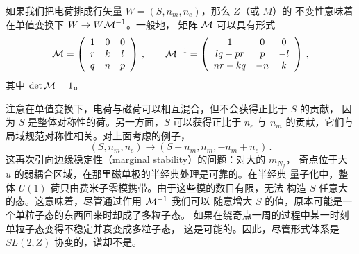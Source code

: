 如果我们把电荷排成行矢量 $W = (S, n_m, n_e)$，那么 $Z$（或 $M$）的
不变性意味着在单值变换下 $W \rightarrow W{\cal M}^{-1}$。一般地，
矩阵 ${\cal M}$ 可以具有形式
$$
{\cal M} = \left ( \begin{array}{ccc}
1 & 0 & 0 \\ r & k & l \\ q & n & p
\end{array} \right )\,,
\qquad
{\cal M}^{-1} = \left ( \begin{array}{ccc}
1 & 0 & 0 \\ lq-pr & p & -l \\
nr-kq & -n & k
\end{array} \right )\,,
$$
其中 $\det {\cal M} = 1$。


注意在单值变换下，电荷与磁荷可以相互混合，但不会获得正比于 $S$ 的贡献，
因为 $S$ 是整体对称性的荷。另一方面，$S$ 可以获得正比于 $n_e$ 与 $n_m$
的贡献，它们与局域规范对称性相关。对上面考虑的例子，
$$
(S, n_m, n_e ) \rightarrow (S + n_m, n_m, -n_m + n_e )\,.
$$
这再次引向边缘稳定性（marginal stability）的问题：对大的 $m_{N_f}$，
奇点位于大 $u$ 的弱耦合区域，在那里磁单极的半经典处理是可靠的。在半经典
量子化中，整体 $U(1)$ 荷只由费米子零模携带。由于这些模的数目有限，无法
构造 $S$ 任意大的态。这意味着，尽管通过作用 ${\cal M}^{-1}$ 我们可以
随意增大 $S$ 的值，原本可能是一个单粒子态的东西回来时却成了多粒子态。
如果在绕奇点一周的过程中某一时刻单粒子态变得不稳定并衰变成多粒子态，
这是可能的。因此，尽管形式体系是 $SL(2, Z)$ 协变的，谱却不是。


